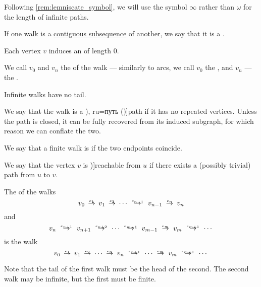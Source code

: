 \begin{definition}
\begin{thmenum}[resume=def:graph_walk]
    Following \cref{rem:lemniscate_symbol}, we will use the symbol \( \infty \) rather than \( \omega \) for the length of infinite paths.

     If one walk is a \hyperref[def:contiguous_subsequence]{contiguous subsequence} of another, we say that it is a .

     Each vertex \( v \) induces an  of length \( 0 \).

     We call \( v_0 \) and \( v_n \) the  of the walk --- similarly to arcs, we call \( v_0 \) the , and \( v_n \) --- the .

    Infinite walks have no tail.

     We say that the walk is a \term[bg=път (\cite[11]{Мирчев2001Графи}), ru=путь (\cite[278]{БелоусовТкачёв2004ДискретнаяМатематика})]{path} if it has no repeated vertices. Unless the path is closed, it can be fully recovered from its induced subgraph, for which reason we can conflate the two.

     We say that a finite walk is  if the two endpoints coincide.

     We say that the vertex \( v \) is \term[ru=достижимая (вершина) (\cite[278]{БелоусовТкачёв2004ДискретнаяМатематика})]{reachable} from \( u \) if there exists a (possibly trivial) path from \( u \) to \( v \).

     The  of the walks
    \begin{equation*}
      v_0 \reloset {e_1} \to v_1 \reloset {e_2} \to \cdots \reloset {e_{n-1}} \to v_{n-1} \reloset {e_n} \to v_n
    \end{equation*}
    and
    \begin{equation*}
      v_n \reloset {e_{n+1}} \to v_{n+1} \reloset {e_{n+2}} \to \cdots \reloset {e_{m-1}} \to v_{m-1} \reloset {e_m} \to v_m \reloset {e_{m+1}} \to \cdots
    \end{equation*}
    is the walk
    \begin{equation*}
      v_0 \reloset {e_1} \to v_1 \reloset {e_2} \to \cdots \reloset {e_n} \to v_n \reloset {e_{n+1}} \to \cdots \reloset {e_m} \to v_m  \reloset {e_{m+1}} \to \cdots
    \end{equation*}

    Note that the tail of the first walk must be the head of the second. The second walk may be infinite, but the first must be finite.
  \end{thmenum}
\end{definition}
